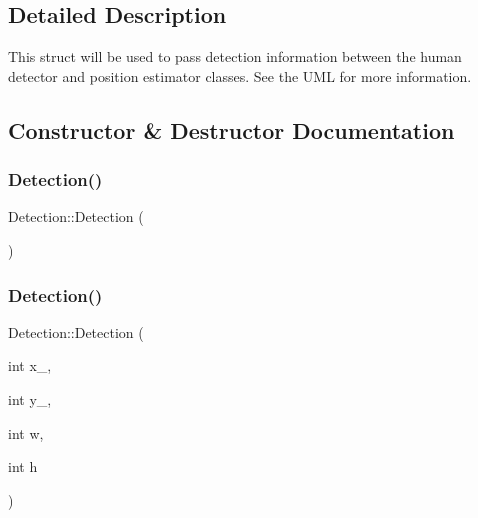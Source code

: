 \subsection{Detailed Description}
This struct will be used to pass detection information between the human detector and position estimator classes. See the U\+ML for more information. 

\subsection{Constructor \& Destructor Documentation}
\mbox{\label{struct_detection_a86e6ebf5a660a29e78ee7a7f08292260}} 
\subsubsection{\texorpdfstring{Detection()}{Detection()}\hspace{0.1cm}{\footnotesize\ttfamily [1/3]}}
{\footnotesize\ttfamily Detection\+::\+Detection (\begin{DoxyParamCaption}{ }\end{DoxyParamCaption})\hspace{0.3cm}{\ttfamily [inline]}}

\mbox{\label{struct_detection_ac35051436ab3ae544f40f9aa08a0ebb1}} 
\subsubsection{\texorpdfstring{Detection()}{Detection()}\hspace{0.1cm}{\footnotesize\ttfamily [2/3]}}
{\footnotesize\ttfamily Detection\+::\+Detection (\begin{DoxyParamCaption}\item[{int}]{x\+\_\+,  }\item[{int}]{y\+\_\+,  }\item[{int}]{w,  }\item[{int}]{h }\end{DoxyParamCaption})\hspace{0.3cm}{\ttfamily [inline]}}

\mbox{\label{struct_detection_ad50a7695ff3ce61ee5c10443d9210c1e}} 
